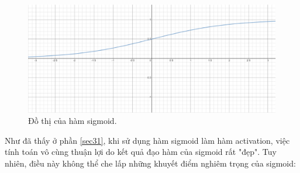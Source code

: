 \begin{figure}[!h]
	\centering
		\includegraphics[width=0.75\columnwidth]{chapter03/figure/HamSigmoid.png}
        \caption{Đồ thị của hàm sigmoid.}
        \label{fig:HamSigmoid}
		\centering
\end{figure}

Như đã thấy ở phần \ref{sec31}, khi sử dụng hàm sigmoid làm hàm activation, việc tính toán vô cùng thuận lợi do kết quả đạo hàm của sigmoid rất "đẹp". Tuy nhiên, điều này không thể che lấp những khuyết điểm nghiêm trọng của sigmoid:

